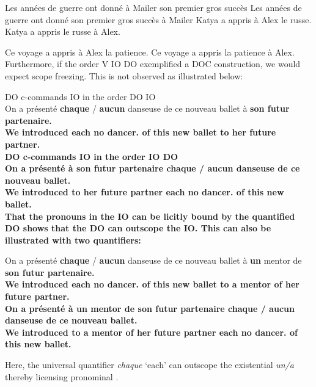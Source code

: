 \documentclass[output=paper]{langsci/langscibook}
\begin{document}
\ea \ea Les ann\'ees de guerre ont donn\'e \`a Mailer son premier gros succ\`es
\ex Les ann\'ees de guerre ont donn\'e son premier gros succ\`es \`a Mailer
\z
\z
\newpage
\ea \ea Katya a appris \`a Alex le russe.
\ex Katya a appris le russe  \`a Alex.
\z
\z

\ea \ea Ce voyage a appris \`a Alex la patience.
\ex Ce voyage a appris la patience  \`a Alex.
\z
\z
%
Furthermore, if the order V IO DO exemplified a \gls{DOC} construction, we
would expect scope freezing. This is not observed as illustrated below:

\ea \label{doio4}
\ea  DO c-commands IO in the order DO IO\\
\gll On a  pr\'{e}sent\'{e} {\bf chaque} / {\bf aucun} danseuse de ce nouveau ballet \`{a} \bf{son} futur partenaire.\\
We {} introduced each {} no dancer.\glossF{} of this new ballet to her future partner.\\
\ex  DO c-commands IO in the order IO DO\\
\gll On a  pr\'{e}sent\'{e}  \`{a} {\bf son} futur partenaire {\bf chaque} / {\bf aucun} danseuse de ce nouveau ballet.\\
We {} introduced to her future partner each {} no dancer.\glossF{} of this new ballet.\\
\z
\z
%
That the pronouns in the IO can be licitly bound by the quantified DO shows
that the DO can outscope the IO. This can also be illustrated with two
    quantifiers:

\begin{exe}
    \ex\label{ex:key:20.28}%
    \begin{xlist}
    \ex
        \gll On {a  pr\'{e}sent\'{e}} {\bf chaque} / {\bf aucun} danseuse de ce nouveau ballet \`{a} {\bf un} mentor de \bf{son} futur partenaire.\\
        We introduced each {} no dancer.\glossF{} of this new ballet to a mentor of her future partner.\\
        \ex  \gll On {a  pr\'{e}sent\'{e}}  \`{a} {\bf un} mentor de {\bf son} futur partenaire {\bf chaque} / {\bf aucun} danseuse de ce nouveau ballet.\\
        We introduced to a mentor of her future partner each {} no dancer.\glossF{} of this new ballet.\\
    \end{xlist}
\end{exe}
%
Here, the universal quantifier {\it chaque} \enquote*{each} can outscope the
existential {\it un/a} thereby licensing pronominal .
\end{document}
